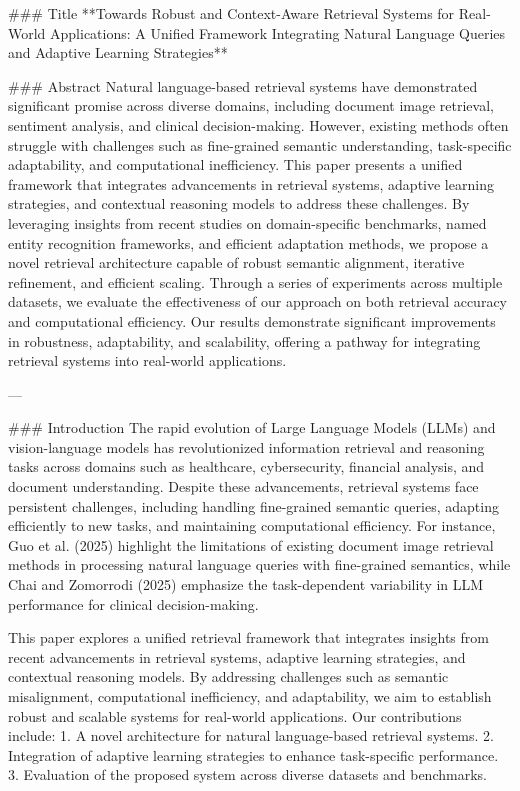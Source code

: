### Title
**Towards Robust and Context-Aware Retrieval Systems for Real-World Applications: A Unified Framework Integrating Natural Language Queries and Adaptive Learning Strategies**

### Abstract
Natural language-based retrieval systems have demonstrated significant promise across diverse domains, including document image retrieval, sentiment analysis, and clinical decision-making. However, existing methods often struggle with challenges such as fine-grained semantic understanding, task-specific adaptability, and computational inefficiency. This paper presents a unified framework that integrates advancements in retrieval systems, adaptive learning strategies, and contextual reasoning models to address these challenges. By leveraging insights from recent studies on domain-specific benchmarks, named entity recognition frameworks, and efficient adaptation methods, we propose a novel retrieval architecture capable of robust semantic alignment, iterative refinement, and efficient scaling. Through a series of experiments across multiple datasets, we evaluate the effectiveness of our approach on both retrieval accuracy and computational efficiency. Our results demonstrate significant improvements in robustness, adaptability, and scalability, offering a pathway for integrating retrieval systems into real-world applications.

---

### Introduction
The rapid evolution of Large Language Models (LLMs) and vision-language models has revolutionized information retrieval and reasoning tasks across domains such as healthcare, cybersecurity, financial analysis, and document understanding. Despite these advancements, retrieval systems face persistent challenges, including handling fine-grained semantic queries, adapting efficiently to new tasks, and maintaining computational efficiency. For instance, Guo et al. (2025) highlight the limitations of existing document image retrieval methods in processing natural language queries with fine-grained semantics, while Chai and Zomorrodi (2025) emphasize the task-dependent variability in LLM performance for clinical decision-making.

This paper explores a unified retrieval framework that integrates insights from recent advancements in retrieval systems, adaptive learning strategies, and contextual reasoning models. By addressing challenges such as semantic misalignment, computational inefficiency, and adaptability, we aim to establish robust and scalable systems for real-world applications. Our contributions include:
1. A novel architecture for natural language-based retrieval systems.
2. Integration of adaptive learning strategies to enhance task-specific performance.
3. Evaluation of the proposed system across diverse datasets and benchmarks.

